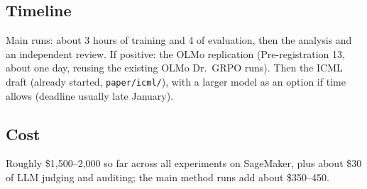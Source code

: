 \documentclass[11pt]{article}
\begin{document}
\subsection{Timeline}
Main runs: about 3 hours of training and 4 of evaluation, then the analysis and an independent review. If positive: the OLMo replication (Pre-registration 13, about one day, reusing the existing OLMo Dr.\ GRPO runs). Then the ICML draft (already started, \texttt{paper/icml/}), with a larger model as an option if time allows (deadline usually late January).

\subsection{Cost}
Roughly \$1,500--2,000 so far across all experiments on SageMaker, plus about \$30 of LLM judging and auditing; the main method runs add about \$350--450.

\appendix
\end{document}
